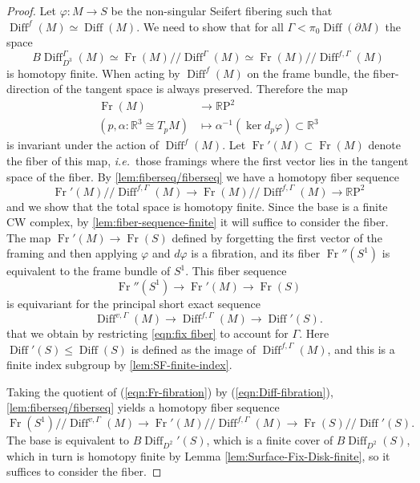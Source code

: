 \documentclass{amsart}
\theoremstyle{plain}
\theoremstyle{definition}
\DeclareMathOperator\Diff{Diff}
\DeclareMathOperator\Fr{Fr}
\newcommand{\hq}{/\!\!/} %
\newcommand{\BDiff}{B\!\Diff}
\newcommand{\bbR}{\mathbb{R}}
\newcommand{\RP}{\mathbb{R}\mathrm{P}}
\begin{document}
\begin{proof}
    Let $\varphi \colon M \to S$ be the non-singular Seifert fibering such that $\Diff^f(M) \simeq \Diff(M)$.
    We need to show that for all $\Gamma < \pi_0\Diff(\partial M)$ the space
    \[
        \BDiff_{D^3}^\Gamma(M) \simeq \Fr(M)\hq \Diff^\Gamma(M) \simeq \Fr(M) \hq \Diff^{f, \Gamma}(M)
    \]
    is homotopy finite.
    When acting by $\Diff^f(M)$ on the frame bundle, the fiber-direction of the tangent space is always preserved.
    Therefore the map
    \begin{align*}
        \Fr(M) & \longrightarrow \RP^2 \\ 
        (p, \alpha \colon \bbR^3 \cong T_pM) &\longmapsto \alpha^{-1}(\ker d_p\varphi) \subset \bbR^3
    \end{align*}
    is invariant under the action of $\Diff^f(M)$.
    Let $\Fr'(M) \subset \Fr(M)$ denote the fiber of this map, \emph{i.e.}~those framings where the first vector lies in the tangent space of the fiber. By \cref{lem:fiberseq/fiberseq} we have a homotopy fiber sequence
    \[
        \Fr'(M)\hq \Diff^{f,\Gamma}(M) \longrightarrow
        \Fr(M)\hq \Diff^{f,\Gamma}(M) \longrightarrow
        \RP^2
    \]
    and we show that the total space is homotopy finite.
    Since the base is a finite CW complex, by \cref{lem:fiber-sequence-finite} it will suffice to consider the fiber.
    The map $\Fr'(M) \to \Fr(S)$ defined by forgetting the first vector of the framing and then applying $\varphi$ and $d\varphi$ is a fibration, and its fiber $\Fr''(S^1)$ is equivalent to the frame bundle of $S^1$.
    This fiber sequence 
    \begin{equation}\label{eqn:Fr-fibration}
        \Fr''(S^1) \longrightarrow \Fr'(M) \longrightarrow \Fr(S)
    \end{equation}
    is equivariant for the principal short exact sequence
    \begin{equation}\label{eqn:Diff-fibration}
        \Diff^{v,\Gamma}(M) \longrightarrow
        \Diff^{f,\Gamma}(M) \longrightarrow
        \Diff'(S).
    \end{equation}
    that we obtain by restricting \cref{eqn:fix fiber} to account for $\Gamma$.
    Here $\Diff'(S) \le \Diff(S)$ is defined as the image of $\Diff^{f,\Gamma}(M)$, and this is a finite index subgroup by \cref{lem:SF-finite-index}.
    
    Taking the quotient of (\ref{eqn:Fr-fibration}) by (\ref{eqn:Diff-fibration}), \cref{lem:fiberseq/fiberseq} yields a homotopy fiber sequence
    \[
        \Fr(S^1)\hq \Diff^{v,\Gamma}(M) \longrightarrow
        \Fr'(M)\hq \Diff^{f,\Gamma}(M) \longrightarrow
        \Fr(S)\hq \Diff'(S).
    \]
    The base is equivalent to $\BDiff_{D^2}'(S)$, which is a finite cover of $\BDiff_{D^2}(S)$, which in turn is homotopy finite by Lemma \ref{lem:Surface-Fix-Disk-finite}, so it suffices to consider the fiber.
    

\end{proof}
\end{document}
